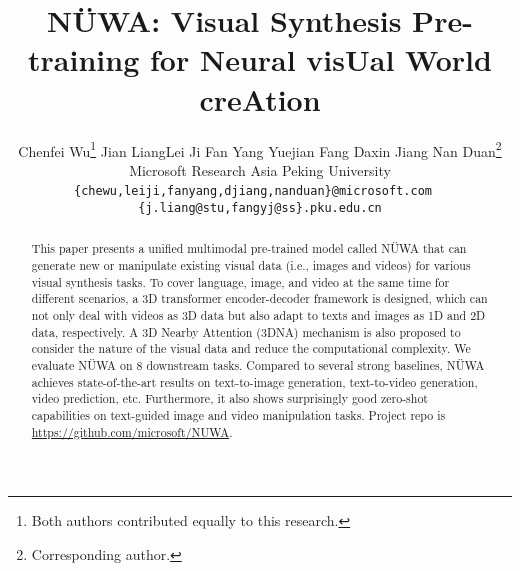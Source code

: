 \documentclass[10pt,twocolumn,letterpaper]{article}
\begin{document}
\title{\textcolor[rgb]{0.965,0.325,0.078}{N}\textcolor[rgb]{0.486,0.733,0}{Ü}\textcolor[rgb]{0,0.631,0.945}{W}\textcolor[rgb]{1,0.733,0}{A}: Visual Synthesis Pre-training for \textcolor[rgb]{0.965,0.325,0.078}{N}eural vis\textcolor[rgb]{0.486,0.733,0}{U}al \textcolor[rgb]{0,0.631,0.945}{W}orld cre\textcolor[rgb]{1,0.733,0}{A}tion}

\author{Chenfei Wu\thanks{Both authors contributed equally to this research.} \quad Jian Liang\samethanks[1] \quad Lei Ji \quad  Fan Yang \quad Yuejian Fang \quad Daxin Jiang \quad Nan Duan\thanks{Corresponding author.} \\
 {\small Microsoft Research Asia \quad Peking University} \\
{\tt\small\{chewu,leiji,fanyang,djiang,nanduan\}@microsoft.com}~~ {\tt\small\{j.liang@stu,fangyj@ss\}.pku.edu.cn}}

\twocolumn[{
\renewcommand\twocolumn[1][]{#1}
\maketitle
\begin{center}
    \centering
    \captionsetup{type=figure}
    \texttt{[image: imgs/Overview.pdf]}
    \captionof{figure}{Examples of 8 typical visual generation and manipulation tasks supported by the NÜWA model.}
    \label{fig:Overview}
    
\end{center}
}]
\saythanks
\begin{abstract}

This paper presents a unified multimodal pre-trained model called NÜWA that can generate new or manipulate existing visual data (i.e., images and videos) for various visual synthesis tasks. To cover language, image, and video at the same time for different scenarios, a 3D transformer encoder-decoder framework is designed, which can not only deal with videos as 3D data but also adapt to texts and images as 1D and 2D data, respectively. A 3D Nearby Attention (3DNA) mechanism is also proposed to consider the nature of the visual data and reduce the computational complexity. We evaluate NÜWA on 8 downstream tasks. Compared to several strong baselines, NÜWA achieves state-of-the-art results on text-to-image generation, text-to-video generation, video prediction, etc. Furthermore, it also shows surprisingly good zero-shot capabilities on text-guided image and video manipulation tasks. Project repo is \url{https://github.com/microsoft/NUWA}.

\end{abstract}
\end{document}

